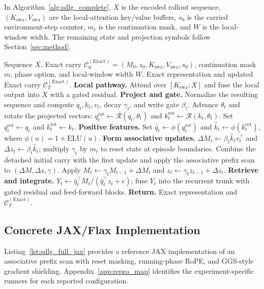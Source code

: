 In Algorithm~\ref{alg:sdlg_complete}, $X$ is the encoded rollout sequence, $(K_{\mathrm{swa}},V_{\mathrm{swa}})$ are the local-attention key/value buffers, $s_0$ is the carried environment-step counter, $m_t$ is the continuation mask, and $W$ is the local-window width. The remaining state and projection symbols follow Section~\ref{sec:method}.

\begin{algorithm}[H]
\caption{Exact SdLG State Update and Read}
\label{alg:sdlg_complete}
\begin{algorithmic}[1]
\REQUIRE Sequence $X$, Exact carry $\mathcal{C}^{(\mathrm{Exact})}_0=(M_0,z_0,K_{\mathrm{swa}},V_{\mathrm{swa}},s_0)$, continuation mask $m$, phase option, and local-window width $W$.
\ENSURE Exact representation and updated Exact carry $\mathcal{C}^{(\mathrm{Exact})}_T$.
\STATE \textbf{Local pathway.} Attend over $[K_{\mathrm{swa}};X]$ and fuse the local output into $X$ with a gated residual.
\STATE \textbf{Project and gate.} Normalize the resulting sequence and compute $q_t,k_t,v_t$, decay $\gamma_t$, and write gate $\beta_t$.
    \STATE Advance $\theta_t$ and rotate the projected vectors: $q_t^{\mathrm{rot}}\leftarrow\mathcal R(q_t,\theta_t)$ and $k_t^{\mathrm{rot}}\leftarrow\mathcal R(k_t,\theta_t)$.
\ELSE
    \STATE Set $q_t^{\mathrm{rot}}\leftarrow q_t$ and $k_t^{\mathrm{rot}}\leftarrow k_t$.
\ENDIF
\STATE \textbf{Positive features.} Set $\hat q_t\leftarrow\phi(q_t^{\mathrm{rot}})$ and $\hat k_t\leftarrow\phi(k_t^{\mathrm{rot}})$, where $\phi(u)=1+\mathrm{ELU}(u)$.
\STATE \textbf{Form associative updates.} $\Delta M_t\leftarrow\beta_t\hat k_tv_t^\top$ and $\Delta z_t\leftarrow\beta_t\hat k_t$; multiply $\gamma_t$ by $m_t$ to reset state at episode boundaries.
    \STATE Combine the detached initial carry with the first update and apply the associative prefix scan to $(\Delta M,\Delta z,\gamma)$.
\ELSE
    \STATE Apply $M_t\leftarrow\gamma_tM_{t-1}+\Delta M_t$ and $z_t\leftarrow\gamma_tz_{t-1}+\Delta z_t$.
\ENDIF
\STATE \textbf{Retrieve and integrate.} $Y_t\leftarrow\hat q_t^\top M_t/(\hat q_t^\top z_t+\epsilon)$; fuse $Y_t$ into the recurrent trunk with gated residual and feed-forward blocks.
\STATE \textbf{Return.} Exact representation and $\mathcal{C}^{(\mathrm{Exact})}_T$.
\end{algorithmic}
\end{algorithm}

\subsection{Concrete JAX/Flax Implementation}
Listing~\ref{lst:sdlg_full_jax} provides a reference JAX implementation of an associative prefix scan with reset masking, running-phase RoPE, and GGS-style gradient shielding. Appendix~\ref{app:repro_map} identifies the experiment-specific runners for each reported configuration.

